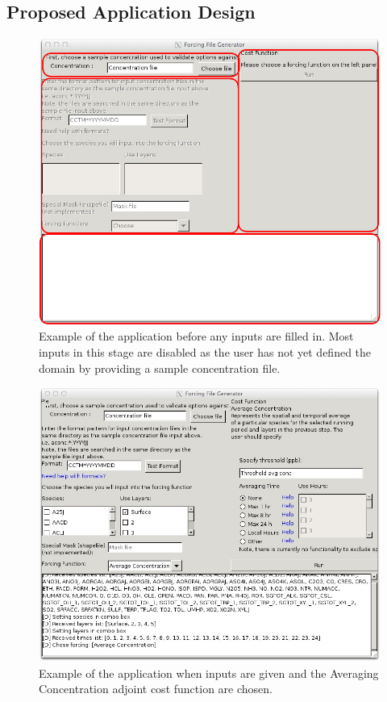 \documentclass{article}
\begin{document}
\subsection{Proposed Application Design}

\begin{figure}
	\centering
	\includegraphics[width=\textwidth]{Forcing_App_Layout.jpg}
	\caption{Example of the application before any inputs are filled in.  Most inputs in this stage are disabled as the user has not yet defined the domain by providing a sample concentration file.}
	\label{ss}
\end{figure}

\begin{figure}
	\centering
	\includegraphics[width=\textwidth]{Forcing_App_Layout-filled.jpg}
	\caption{Example of the application when inputs are given and the Averaging Concentration adjoint cost function are chosen.}
	\label{ssfilled}
\end{figure}
\end{document}
